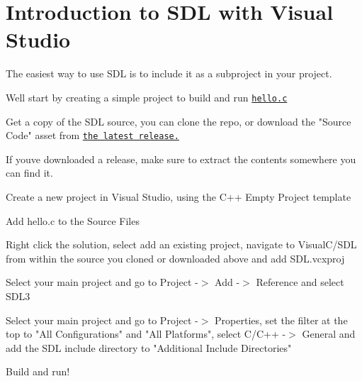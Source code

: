\chapter{Introduction to SDL with Visual Studio }
\hypertarget{md__mono_runtime_2extern_2sdl_2docs_2_i_n_t_r_o-visualstudio}{}\label{md__mono_runtime_2extern_2sdl_2docs_2_i_n_t_r_o-visualstudio}
\label{md__mono_runtime_2extern_2sdl_2docs_2_i_n_t_r_o-visualstudio_autotoc_md1179}%
%


The easiest way to use SDL is to include it as a subproject in your project.

We\textquotesingle{}ll start by creating a simple project to build and run \href{hello.c}{\texttt{hello.\+c}}


\begin{DoxyItemize}
\item Get a copy of the SDL source, you can clone the repo, or download the "{}\+Source Code"{} asset from \href{https://github.com/libsdl-org/SDL/releases/latest}{\texttt{the latest release.}}
\begin{DoxyItemize}
\item If you\textquotesingle{}ve downloaded a release, make sure to extract the contents somewhere you can find it.
\end{DoxyItemize}
\item Create a new project in Visual Studio, using the C++ Empty Project template
\item Add hello.\+c to the Source Files
\item Right click the solution, select add an existing project, navigate to {\ttfamily Visual\+C/\+\+SDL} from within the source you cloned or downloaded above and add SDL.\+vcxproj
\item Select your main project and go to Project -\/\texorpdfstring{$>$}{>} Add -\/\texorpdfstring{$>$}{>} Reference and select SDL3
\item Select your main project and go to Project -\/\texorpdfstring{$>$}{>} Properties, set the filter at the top to "{}\+All Configurations"{} and "{}\+All Platforms"{}, select C/\+\+C++ -\/\texorpdfstring{$>$}{>} General and add the SDL include directory to "{}\+Additional Include Directories"{}
\item Build and run! 
\end{DoxyItemize}